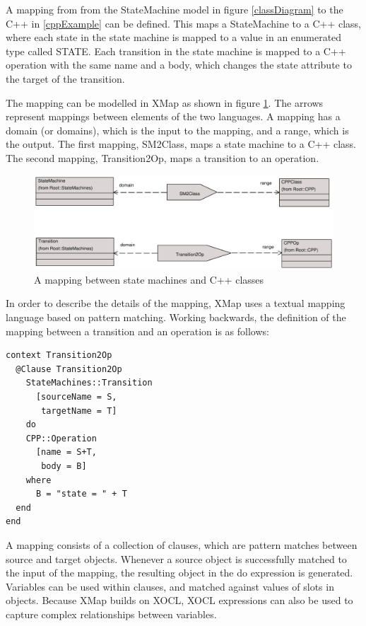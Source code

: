 A mapping from from the StateMachine model in figure
\ref{classDiagram} to the {C++} in \ref{cppExample} can be
defined. This maps a StateMachine to a {C++} class, where each
state in the state machine is mapped to a value in an enumerated
type called STATE. Each transition in the state machine is mapped
to a {C++} operation with the same name and a body, which changes
the state attribute to the target of the transition.

The mapping can be modelled in XMap as shown in figure
\ref{cppmapping}.  The arrows represent mappings between elements
of the two languages. A mapping has a domain (or domains), which
is the input to the mapping, and a range, which is the output. The
first mapping, SM2Class, maps a state machine to a C++ class. The
second mapping, Transition2Op, maps a transition to an operation.

\begin{figure}[htb]
\begin{center}
\includegraphics[width=14cm]{XMF/figures/cppMapping}
\caption{A mapping between state machines and C++ classes}
\label{cppmapping}
\end{center}
\end{figure}

In order to describe the details of the mapping, XMap uses a
textual  mapping language based on pattern matching. Working
backwards, the definition of the mapping between a transition and
an operation is as follows:

\begin{lstlisting}
context Transition2Op
  @Clause Transition2Op
    StateMachines::Transition
      [sourceName = S,
       targetName = T]
    do
    CPP::Operation
      [name = S+T,
       body = B]
    where
      B = "state = " + T
  end
end
\end{lstlisting}A mapping consists of a collection of clauses, which are pattern
matches between source and target objects. Whenever a source object
is successfully matched to the input of the mapping, the resulting
object in the do expression is generated. Variables can be used
within clauses, and matched against values of slots in objects.
Because XMap builds on XOCL, XOCL expressions can also be used to
capture complex relationships between variables.

